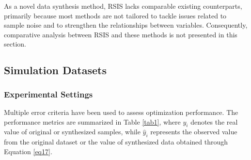 \documentclass[final,3p,times]{elsarticle}
\begin{document}
As a novel data synthesis method, RSIS lacks comparable existing 
counterparts, primarily because most methods are not tailored to 
tackle issues related to sample noise and to strengthen the 
relationships between variables. Consequently, comparative analysis between RSIS and 
these methods is not presented in this section.



\subsection{Simulation Datasets}


\subsubsection{Experimental Settings}
Multiple error criteria have been used to assess optimization 
performance. The performance metrics are summarized in Table \ref{tab1}, 
where $y_i$ denotes the real value of original or synthesized 
samples, while $\hat{y}_i$ represents the observed value from the 
original dataset or the value of synthesized data obtained through 
Equation \eqref{eq17}.
\end{document}
